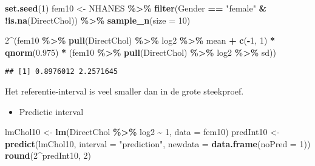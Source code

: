 \documentclass[
  12pt,dutch,coursenotes]{book}
\newenvironment{Shaded}{\begin{snugshade}}{\end{snugshade}}
\newcommand{\DataTypeTok}[1]{\textcolor[rgb]{0.13,0.29,0.53}{#1}}
\newcommand{\DecValTok}[1]{\textcolor[rgb]{0.00,0.00,0.81}{#1}}
\newcommand{\FloatTok}[1]{\textcolor[rgb]{0.00,0.00,0.81}{#1}}
\newcommand{\KeywordTok}[1]{\textcolor[rgb]{0.13,0.29,0.53}{\textbf{#1}}}
\newcommand{\NormalTok}[1]{#1}
\newcommand{\OperatorTok}[1]{\textcolor[rgb]{0.81,0.36,0.00}{\textbf{#1}}}
\newcommand{\StringTok}[1]{\textcolor[rgb]{0.31,0.60,0.02}{#1}}
\providecommand{\tightlist}{%
  \setlength{\itemsep}{0pt}\setlength{\parskip}{0pt}}
\theoremstyle{definition}
\theoremstyle{definition}
\theoremstyle{definition}
\theoremstyle{remark}
\begin{document}
\begin{Shaded}
\begin{Highlighting}[]
\KeywordTok{set.seed}\NormalTok{(}\DecValTok{1}\NormalTok{)}
\NormalTok{fem10 \textless{}{-}}\StringTok{ }\NormalTok{NHANES }\OperatorTok{\%\textgreater{}\%}\StringTok{ }\KeywordTok{filter}\NormalTok{(Gender }\OperatorTok{==}\StringTok{ "female"} \OperatorTok{\&}\StringTok{ }\OperatorTok{!}\KeywordTok{is.na}\NormalTok{(DirectChol)) }\OperatorTok{\%\textgreater{}\%}\StringTok{ }
\StringTok{    }\KeywordTok{sample\_n}\NormalTok{(}\DataTypeTok{size =} \DecValTok{10}\NormalTok{)}

\DecValTok{2}\OperatorTok{\^{}}\NormalTok{(fem10 }\OperatorTok{\%\textgreater{}\%}\StringTok{ }\KeywordTok{pull}\NormalTok{(DirectChol) }\OperatorTok{\%\textgreater{}\%}\StringTok{ }\NormalTok{log2 }\OperatorTok{\%\textgreater{}\%}\StringTok{ }\NormalTok{mean }\OperatorTok{+}\StringTok{ }\KeywordTok{c}\NormalTok{(}\OperatorTok{{-}}\DecValTok{1}\NormalTok{, }
    \DecValTok{1}\NormalTok{) }\OperatorTok{*}\StringTok{ }\KeywordTok{qnorm}\NormalTok{(}\FloatTok{0.975}\NormalTok{) }\OperatorTok{*}\StringTok{ }\NormalTok{(fem10 }\OperatorTok{\%\textgreater{}\%}\StringTok{ }\KeywordTok{pull}\NormalTok{(DirectChol) }\OperatorTok{\%\textgreater{}\%}\StringTok{ }
\StringTok{    }\NormalTok{log2 }\OperatorTok{\%\textgreater{}\%}\StringTok{ }\NormalTok{sd))}
\end{Highlighting}
\end{Shaded}

\begin{verbatim}
## [1] 0.8976012 2.2571645
\end{verbatim}

Het referentie-interval is veel smaller dan in de grote steekproef.

\begin{itemize}
\tightlist
\item
  Predictie interval
\end{itemize}

\begin{Shaded}
\begin{Highlighting}[]
\NormalTok{lmChol10 \textless{}{-}}\StringTok{ }\KeywordTok{lm}\NormalTok{(DirectChol }\OperatorTok{\%\textgreater{}\%}\StringTok{ }\NormalTok{log2 }\OperatorTok{\textasciitilde{}}\StringTok{ }\DecValTok{1}\NormalTok{, }\DataTypeTok{data =}\NormalTok{ fem10)}
\NormalTok{predInt10 \textless{}{-}}\StringTok{ }\KeywordTok{predict}\NormalTok{(lmChol10, }\DataTypeTok{interval =} \StringTok{"prediction"}\NormalTok{, }
    \DataTypeTok{newdata =} \KeywordTok{data.frame}\NormalTok{(}\DataTypeTok{noPred =} \DecValTok{1}\NormalTok{))}
\KeywordTok{round}\NormalTok{(}\DecValTok{2}\OperatorTok{\^{}}\NormalTok{predInt10, }\DecValTok{2}\NormalTok{)}
\end{Highlighting}
\end{Shaded}
\end{document}
